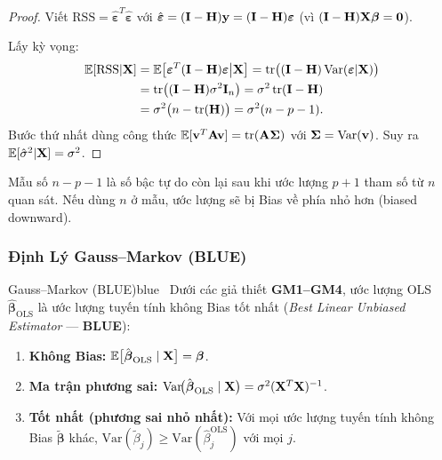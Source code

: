 \begin{proof}
Viết $\mathrm{RSS} = \hat{\boldsymbol{\varepsilon}}^T\hat{\boldsymbol{\varepsilon}}$
với $\hat{\boldsymbol{\varepsilon}} = (\mathbf{I}-\mathbf{H})\mathbf{y}
= (\mathbf{I}-\mathbf{H})\boldsymbol{\varepsilon}$ (vì
$(\mathbf{I}-\mathbf{H})\mathbf{X}\boldsymbol{\beta} = \mathbf{0}$).

Lấy kỳ vọng:
\begin{align*}
    \mathbb{E}[\mathrm{RSS}|\mathbf{X}]
    &= \mathbb{E}\bigl[\boldsymbol{\varepsilon}^T(\mathbf{I}-\mathbf{H})\boldsymbol{\varepsilon}
               \big|\mathbf{X}\bigr]
     = \operatorname{tr}\bigl((\mathbf{I}-\mathbf{H})\,\mathrm{Var}(\boldsymbol{\varepsilon}|\mathbf{X})\bigr) \\
    &= \operatorname{tr}\bigl((\mathbf{I}-\mathbf{H})\sigma^2\mathbf{I}_n\bigr)
     = \sigma^2\operatorname{tr}(\mathbf{I}-\mathbf{H}) \\
    &= \sigma^2\bigl(n - \operatorname{tr}(\mathbf{H})\bigr)
     = \sigma^2(n - p - 1).
\end{align*}
Bước thứ nhất dùng công thức $\mathbb{E}[\mathbf{v}^T\mathbf{A}\mathbf{v}] = \operatorname{tr}(\mathbf{A}\boldsymbol{\Sigma})$
với $\boldsymbol{\Sigma} = \mathrm{Var}(\mathbf{v})$.
Suy ra $\mathbb{E}[\hat{\sigma}^2|\mathbf{X}] = \sigma^2$.
\end{proof}

\begin{note}
Mẫu số $n - p - 1$ là số bậc tự do còn lại sau khi ước lượng $p+1$ tham số từ
$n$ quan sát. Nếu dùng $n$ ở mẫu, ước lượng sẽ bị Bias về phía nhỏ hơn (biased
downward).
\end{note}

\subsubsection{Định Lý Gauss–Markov (BLUE)}
\label{subsec:blue}

\begin{mythm}{Gauss--Markov (BLUE)}{blue}~\cite{wooldridge2013}
Dưới các giả thiết \textbf{GM1–GM4}, ước lượng OLS $\hat{\boldsymbol{\beta}}_{\mathrm{OLS}}$
là ước lượng tuyến tính không Bias tốt nhất
(\textit{Best Linear Unbiased Estimator} --- \textbf{BLUE}):
\begin{enumerate}[label=(\roman*), noitemsep]
    \item \textbf{Không Bias:}
          $\mathbb{E}\bigl[\hat{\boldsymbol{\beta}}_{\mathrm{OLS}} \mid \mathbf{X}\bigr] = \boldsymbol{\beta}$.
    \item \textbf{Ma trận phương sai:}
          $\mathrm{Var}\!\bigl(\hat{\boldsymbol{\beta}}_{\mathrm{OLS}} \mid \mathbf{X}\bigr)
          = \sigma^2(\mathbf{X}^T\mathbf{X})^{-1}$.
    \item \textbf{Tốt nhất (phương sai nhỏ nhất):} Với mọi ước lượng tuyến tính
          không Bias $\tilde{\boldsymbol{\beta}}$ khác,
          $\mathrm{Var}(\tilde{\beta}_j) \geq \mathrm{Var}(\hat{\beta}_j^{\mathrm{OLS}})$
          với mọi $j$.
\end{enumerate}
\end{mythm}

